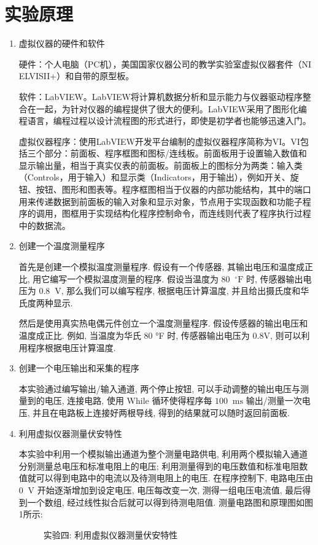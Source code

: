 \documentclass[11pt]{article}
\newcommand*{\unit}[1]{\mathop{}\!\mathrm{#1}}
\begin{document}
\section{实验原理}

\begin{enumerate}

\item 虚拟仪器的硬件和软件

硬件：个人电脑（PC机），美国国家仪器公司的教学实验室虚拟仪器套件（NI ELVISII+）和自带的原型板。

软件：LabVIEW。LabVIEW将计算机数据分析和显示能力与仪器驱动程序整合在一起，为针对仪器的编程提供了很大的便利。LabVIEW采用了图形化编程语言，编程过程以设计流程图的形式进行，即使是初学者也能够迅速入门。

虚拟仪器程序：使用LabVIEW开发平台编制的虚拟仪器程序简称为VI。VI包括三个部分：前面板、程序框图和图标/连线板。前面板用于设置输入数值和显示输出量，相当于真实仪表的前面板。前面板上的图标分为两类：输入类（Controls，用于输入）和显示类（Indicators，用于输出），例如开关、旋钮、按钮、图形和图表等。程序框图相当于仪器的内部功能结构，其中的端口用来传递数据到前面板的输入对象和显示对象，节点用于实现函数和功能子程序的调用，图框用于实现结构化程序控制命令，而连线则代表了程序执行过程中的数据流。

\item 创建一个温度测量程序

首先是创建一个模拟温度测量程序. 假设有一个传感器, 其输出电压和温度成正比, 用它编写一个模拟温度测量的程序. 假设当温度为 $80 \unit{^\circ F} $ 时, 传感器输出电压为 $0.8\unit{V}$, 那么我们可以编写程序, 根据电压计算温度, 并且给出摄氏度和华氏度两种显示.
	
然后是使用真实热电偶元件创立一个温度测量程序. 假设传感器的输出电压和温度成正比. 例如, 当温度为华氏 80 °F 时, 传感器输出电压为 0.8V, 则可以利用程序根据电压计算温度.
	
\item 创建一个电压输出和采集的程序

本实验通过编写输出/输入通道, 两个停止按钮, 可以手动调整的输出电压与测量到的电压, 连接电路, 使用 While 循环使得程序每 $100\unit{ms}$ 输出/测量一次电压, 并且在电路板上连接好两根导线, 得到的结果就可以随时返回前面板.

\item 利用虚拟仪器测量伏安特性

本实验中利用一个模拟输出通道为整个测量电路供电, 利用两个模拟输入通道分别测量总电压和标准电阻上的电压; 利用测量得到的电压数值和标准电阻数值就可以得到电路中的电流以及待测电阻上的电压. 在程序控制下, 电路电压由 $0\unit V$ 开始逐渐增加到设定电压, 电压每改变一次, 测得一组电压电流值, 最后得到一个数组, 经过线性拟合后就可以得到待测电阻值. 测量电路图和原理图如图1所示:

\begin{figure}[H]
    \centering
    \hspace{0.5cm}
    \caption{实验四: 利用虚拟仪器测量伏安特性}
\end{figure}

\end{enumerate}
\end{document}
